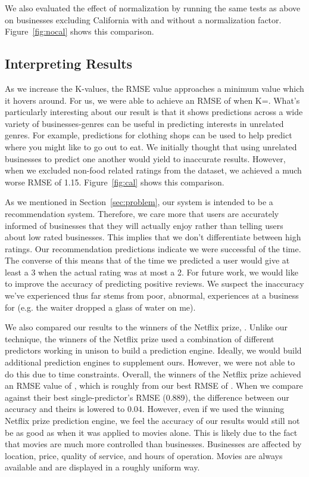 We also evaluated the effect of normalization by running the same tests as
above on businesses excluding California with and without a normalization
factor. Figure~\ref{fig:nocal} shows this comparison.

\subsection{Interpreting Results}
As we increase the K-values, the RMSE value approaches a minimum value which it
hovers around. For us, we were able to achieve an RMSE of \bestRMSE when
K=\bestK.  What's particularly interesting about our result is that it shows
predictions across a wide variety of businesses-genres can be useful in
predicting interests in unrelated genres. For example, predictions for clothing
shops can be used to help predict where you might like to go out to eat. We
initially thought that using unrelated businesses to predict one another would
yield to inaccurate results. However, when we excluded non-food related ratings
from the dataset, we achieved a much worse RMSE of 1.15. Figure~\ref{fig:cal}
shows this comparison.

As we mentioned in Section~\ref{sec:problem}, our system is intended to be a
recommendation system.  Therefore, we care more that users are accurately
informed of businesses that they will actually enjoy rather than telling users
about low rated businesses. This implies that we don't differentiate between
high ratings. Our recommendation predictions indicate we were successful
\posAccuracy of the time. The converse of this means that \posInaccuracy of the
time we predicted a user would give at least a 3 when the actual rating was at
most a 2.  For future work, we would like to improve the accuracy of predicting
positive reviews. We suspect the inaccuracy we've experienced thus far stems
from poor, abnormal, experiences at a business for  (e.g. the waiter dropped a
glass of water on me).

We also compared our results to the winners of the Netflix prize,
\cite{netprize}. Unlike our technique, the winners of the Netflix prize used a
combination of different predictors working in unison to build a prediction
engine. Ideally, we would build additional prediction engines to supplement
ours. However, we were not able to do this due to time constraints. Overall,
the winners of the Netflix prize achieved an RMSE value of \bestNetflixRMSEnsp,
which is roughly \netDiff from our best RMSE of \bestRMSEnsp. When we compare
against their best single-predictor's RMSE (0.889), the difference between our
accuracy and theirs is lowered to 0.04. However, even if we used the winning
Netflix prize prediction engine, we feel the accuracy of our results would
still not be as good as when it was applied to movies alone. This is likely due
to the fact that movies are much more controlled than businesses. Businesses
are affected by location, price, quality of service, and hours of operation.
Movies are always available and are displayed in a roughly uniform way. 


